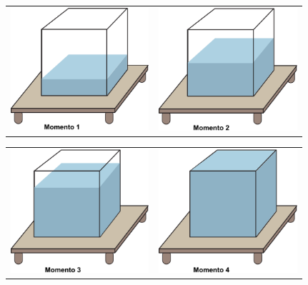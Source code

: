   \begin{center}
  \begin{tabular}{cc}
  \includegraphics[width=145pt, keepaspectratio]{..//media/cap3/secoes/png/ativ1_fig01.png}  & \includegraphics[width=145pt, keepaspectratio]{..//media/cap3/secoes/png/ativ1_fig02.png}
  \end{tabular}\newline
  \begin{tabular}{cc}
  \includegraphics[width=145pt, keepaspectratio]{..//media/cap3/secoes/png/ativ1_fig03.png}  & \includegraphics[width=145pt, keepaspectratio]{..//media/cap3/secoes/png/ativ1_fig04.png}
  \end{tabular}
  \end{center}

